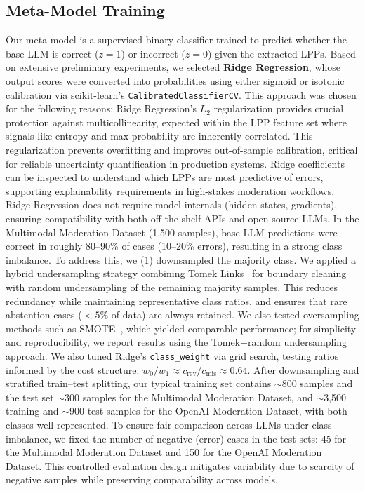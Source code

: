\subsection{Meta-Model Training}
\label{subsec:training}
Our meta-model is a supervised binary classifier trained to predict whether the base LLM is correct ($z=1$) or incorrect ($z=0$) given the extracted LPPs. Based on extensive preliminary experiments, we selected \textbf{Ridge Regression}, whose output scores were converted into probabilities using either sigmoid or isotonic calibration via scikit-learn's \texttt{CalibratedClassifierCV}. This approach was chosen for the following reasons:
 Ridge Regression's $L_2$ regularization provides crucial protection against multicollinearity, expected within the LPP feature set where signals like entropy and max probability are inherently correlated. This regularization prevents overfitting and improves out-of-sample calibration, critical for reliable uncertainty quantification in production systems.
 Ridge coefficients can be inspected to understand which LPPs are most predictive of errors, supporting explainability requirements in high-stakes moderation workflows.
 Ridge Regression does not require model internals (hidden states, gradients), ensuring compatibility with both off-the-shelf APIs and open-source LLMs.
In the Multimodal Moderation Dataset (1,500 samples), base LLM predictions were correct in roughly 80--90\% of cases (10--20\% errors), resulting in a strong class imbalance. To address this, we (1) downsampled the majority class. We applied a hybrid undersampling strategy combining Tomek Links~\cite{wonjae+al:22} for boundary cleaning with random undersampling of the remaining majority samples. This reduces redundancy while maintaining representative class ratios, and ensures that rare abstention cases ($<5\%$ of data) are always retained. We also tested oversampling methods such as SMOTE~\cite{chawla+al:02}, which yielded comparable performance; for simplicity and reproducibility, we report results using the Tomek+random undersampling approach. We also tuned Ridge’s \texttt{class\_weight} via grid search, testing ratios informed by the cost structure: $w_0 / w_1 \approx c_{\text{rev}} / c_{\text{mis}} \approx 0.64$.
After downsampling and stratified train–test splitting, our typical training set contains $\sim$800 samples and the test set $\sim$300 samples for the Multimodal Moderation Dataset, and $\sim$3{,}500 training and $\sim$900 test samples for the OpenAI Moderation Dataset, with both classes well represented. To ensure fair comparison across LLMs under class imbalance, we fixed the number of negative (error) cases in the test sets: 45 for the Multimodal Moderation Dataset and 150 for the OpenAI Moderation Dataset. This controlled evaluation design mitigates variability due to scarcity of negative samples while preserving comparability across models.
